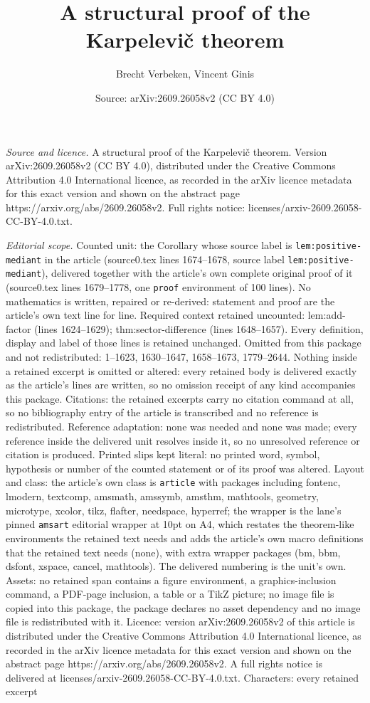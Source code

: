 \documentclass[10pt,a4paper]{amsart}
\title[A structural proof of the Karpelevi\v{c} theorem]{A structural proof of the Karpelevi\v{c} theorem}
\author{Brecht Verbeken, Vincent Ginis}
\date{Source: arXiv:2609.26058v2 (CC BY 4.0)}
\begin{document}
\maketitle

\noindent\emph{Source and licence.} A structural proof of the Karpelevi\v{c} theorem. Version arXiv:2609.26058v2 (CC BY 4.0), distributed under the Creative Commons Attribution 4.0 International licence, as recorded in the arXiv licence metadata for this exact version and shown on the abstract page https://arxiv.org/abs/2609.26058v2. Full rights notice: licenses/arxiv-2609.26058-CC-BY-4.0.txt.\par\smallskip

\noindent\textit{Editorial scope.} Counted unit: the Corollary whose source label is \texttt{lem:positive-mediant} in the article (source0.tex lines 1674--1678, source label \texttt{lem:positive-mediant}), delivered together with the article's own complete original proof of it (source0.tex lines 1679--1778, one \texttt{proof} environment of 100 lines). No mathematics is written, repaired or re-derived: statement and proof are the article's own text line for line. Required context retained uncounted: lem:add-factor (lines 1624--1629); thm:sector-difference (lines 1648--1657). Every definition, display and label of those lines is retained unchanged. Omitted from this package and not redistributed: 1--1623, 1630--1647, 1658--1673, 1779--2644. Nothing inside a retained excerpt is omitted or altered: every retained body is delivered exactly as the article's lines are written, so no omission receipt of any kind accompanies this package. Citations: the retained excerpts carry no citation command at all, so no bibliography entry of the article is transcribed and no reference is redistributed. Reference adaptation: none was needed and none was made; every reference inside the delivered unit resolves inside it, so no unresolved reference or citation is produced. Printed slips kept literal: no printed word, symbol, hypothesis or number of the counted statement or of its proof was altered. Layout and class: the article's own class is \texttt{article} with packages including fontenc, lmodern, textcomp, amsmath, amssymb, amsthm, mathtools, geometry, microtype, xcolor, tikz, flafter, needspace, hyperref; the wrapper is the lane's pinned \texttt{amsart} editorial wrapper at 10pt on A4, which restates the theorem-like environments the retained text needs and adds the article's own macro definitions that the retained text needs (none), with extra wrapper packages (bm, bbm, dsfont, xspace, cancel, mathtools). The delivered numbering is the unit's own. Assets: no retained span contains a figure environment, a graphics-inclusion command, a PDF-page inclusion, a table or a TikZ picture; no image file is copied into this package, the package declares no asset dependency and no image file is redistributed with it. Licence: version arXiv:2609.26058v2 of this article is distributed under the Creative Commons Attribution 4.0 International licence, as recorded in the arXiv licence metadata for this exact version and shown on the abstract page https://arxiv.org/abs/2609.26058v2. A full rights notice is delivered at licenses/arxiv-2609.26058-CC-BY-4.0.txt. Characters: every retained excerpt 
\end{document}
